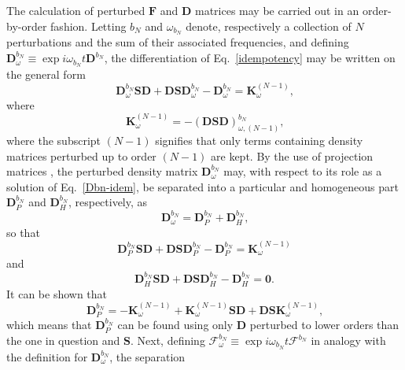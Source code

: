\documentclass[%
 reprint,
 amsmath,amssymb,
 aps,
]{revtex4-1}
\begin{document}
The calculation of perturbed $\mathbf{F}$ and $\mathbf{D}$ matrices may be carried out in an order-by-order fashion. Letting $b_{N}$ and $\omega_{b_{N}}$ denote, respectively a collection of $N$ perturbations and the sum of their associated frequencies, and defining $\mathbf{D}^{b_N}_{\omega} \equiv \exp{i \omega_{b_{N}} t}\mathbf{D}^{b_N}$, the differentiation of Eq.~\eqref{idempotency} may be written on the general form
\begin{equation}\label{Dbn-idem}
\mathbf{D}^{b_N}_{\omega} \mathbf{S} \mathbf{D} + \mathbf{D} \mathbf{S} \mathbf{D}^{b_N}_{\omega} - \mathbf{D}^{b_N}_{\omega} = 
\mathbf{K}^{(N-1)}_{\omega} \text{,}
\end{equation}
where
\begin{equation}\label{Knminus1}
\mathbf{K}^{(N-1)}_{\omega} = - (\mathbf{DSD})^{b_N}_{\omega,(N-1)}\text{,}
\end{equation}
where the subscript $(N - 1)$ signifies that only terms containing density matrices perturbed up to order $(N - 1)$ are kept. By the use of projection matrices , the perturbed density matrix $\mathbf{D}^{b_N}_{\omega}$ may, with respect to its role as a solution of Eq.~\eqref{Dbn-idem}, be separated into a particular and homogeneous part $\mathbf{D}_{P}^{b_N}$ and $\mathbf{D}_{H}^{b_N}$, respectively, as
\begin{equation}\label{D-partitioning}
\mathbf{D}^{b_N}_{\omega} =  
\mathbf{D}_{P}^{b_N} + \mathbf{D}_{H}^{b_N}\text{,}
\end{equation}
so that
\begin{equation}\label{Particular-equation}
\mathbf{D}^{b_N}_P \mathbf{S} \mathbf{D} + \mathbf{D} \mathbf{S} \mathbf{D}^{b_N}_P - \mathbf{D}^{b_N}_{P} = 
\mathbf{K}^{(N-1)}_{\omega}
\end{equation}
and
\begin{equation}\label{Homogeneous-equation}
\mathbf{D}^{b_N}_H \mathbf{S} \mathbf{D} + \mathbf{D} \mathbf{S} \mathbf{D}^{b_N}_H - \mathbf{D}^{b_N}_{H} = 
\mathbf{0} \text{.}
\end{equation}
It can be shown that
\begin{equation}\label{Particular-final}
\mathbf{D}^{b_N}_P = - \mathbf{K}^{(N-1)}_{\omega} + \mathbf{K}^{(N-1)}_{\omega} \mathbf{S} \mathbf{D} + \mathbf{D} \mathbf{S} \mathbf{K}^{(N-1)}_{\omega} \text{,}
\end{equation}
which means that $\mathbf{D}^{b_N}_P$ can be found using only $\mathbf{D}$ perturbed to lower orders than the one in question and $\mathbf{S}$. Next, defining $\bm{\mathcal{F}}^{b_{N}}_{\omega} \equiv \exp{i \omega_{b_{N}} t}\bm{\mathcal{F}}^{b_{N}}$ in analogy with the definition for $\mathbf{D}^{b_N}_{\omega}$, the separation
\end{document}
